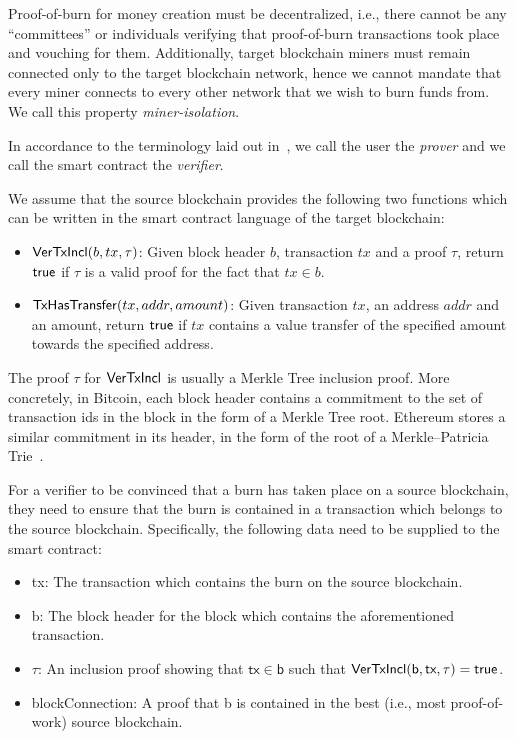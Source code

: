 Proof-of-burn for money creation must be decentralized, i.e., there cannot be any ``committees'' or individuals verifying that proof-of-burn transactions took place and vouching for them. Additionally, target blockchain miners must remain connected only to the target blockchain network, hence we cannot mandate that every miner connects to every other network that we wish to burn funds from. We call this property \emph{miner-isolation}.

In accordance to the terminology laid out in~\cite{pow-sidechains}, we call the user the \emph{prover} and we call the smart contract the \emph{verifier}.

We assume that the source blockchain provides the following two functions which can be written in the smart contract language of the target blockchain:

\begin{itemize}
  \item $\mathsf{VerTxIncl}(b, tx, \tau)$: Given block header $b$, transaction $tx$ and a proof $\tau$, return $\mathsf{true}$ if $\tau$ is a valid proof for the fact that $tx \in b$.
  \item $\mathsf{TxHasTransfer}(tx, addr, amount)$: Given transaction $tx$, an address $addr$ and an amount, return $\mathsf{true}$ if $tx$ contains a value transfer of the specified amount towards the specified address.
\end{itemize}

The proof $\tau$ for $\mathsf{VerTxIncl}$ is usually a Merkle Tree inclusion proof. More concretely, in Bitcoin, each block header contains a commitment to the set of transaction ids in the block in the form of a Merkle Tree root. Ethereum stores a similar commitment in its header, in the form of the root of a Merkle--Patricia Trie~\cite{wood2014ethereum}.

For a verifier to be convinced that a burn has taken place on a source blockchain, they need to ensure that the burn is contained in a transaction which belongs to the source blockchain. Specifically, the following data need to be supplied to the smart contract:

\begin{itemize}
  \item \textsf{tx}: The transaction which contains the burn on the source blockchain.
  \item \textsf{b}: The block header for the block which contains the aforementioned transaction.
  \item $\tau$: An inclusion proof showing that $\mathsf{tx} \in \mathsf{b}$ such that $\mathsf{VerTxIncl}(\textsf{b}, \textsf{tx}, \tau) = \mathsf{true}$.
  \item \textsf{blockConnection}: A proof that \textsf{b} is contained in the best (i.e., most proof-of-work) source blockchain.
\end{itemize}


